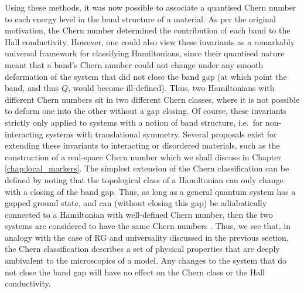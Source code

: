 Using these methods, it was now possible to associate a quantised Chern number to each energy level in the band structure of a material. As per the original motivation, the Chern number determined the contribution of each band to the Hall conductivity. However, one could also view these invariants as a remarkably universal framework for classifying Hamiltonians, since their quantised nature meant that a band's Chern number could not change under any smooth deformation of the system that did not close the band gap (at which point the band, and thus $Q$, would become ill-defined). Thus, two Hamiltonians with different Chern numbers sit in two different Chern classes, where it is not possible to deform one into the other without a gap closing. Of course, these invariants strictly only applied to systems with a notion of band structure, i.e.~for non-interacting systems with translational symmetry. Several proposals exist for extending these invariants to interacting or disordered materials, such as the construction of a real-space Chern number \cite{kitaev_anyons_2006, markov_local_2021, loring_guide_2019, bianco_mapping_2011} which we shall discuss in Chapter \ref{chap:local_markers}. The simplest extension of the Chern classification can be defined by noting that the topological class of a Hamiltonian can only change with a closing of the band gap. Thus, as long as a general quantum system has a gapped ground state, and can (without closing this gap) be adiabatically connected to a Hamiltonian with well-defined Chern number, then the two systems are considered to have the same Chern numbers \cite{varney_topological_2011}. Thus, we see that, in analogy with the case of RG and universality discussed in the previous section, the Chern classification describes a set of physical properties that are deeply ambivalent to the microscopics of a model. Any changes to the system that do not close the band gap will have no effect on the Chern class or the Hall conductivity.
